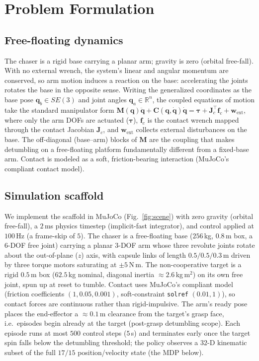 \documentclass[conference]{IEEEtran}
\begin{document}
\section{Problem Formulation}
\subsection{Free-floating dynamics}
The chaser is a rigid base carrying a planar arm; gravity is zero (orbital free-fall). With no
external wrench, the system's linear and angular momentum are conserved, so arm motion induces a
reaction on the base: accelerating the joints rotates the base in the opposite sense. Writing the
generalized coordinates as the base pose $\mathbf{q}_b\in SE(3)$ and joint angles
$\mathbf{q}_a\in\mathbb{R}^{n}$, the coupled equations of motion take the standard manipulator form
$\mathbf{M}(\mathbf{q})\ddot{\mathbf{q}} + \mathbf{C}(\mathbf{q},\dot{\mathbf{q}})\dot{\mathbf{q}}
= \boldsymbol{\tau} + \mathbf{J}_c^{\top}\mathbf{f}_c + \mathbf{w}_{\text{ext}}$, where only the arm
DOFs are actuated ($\boldsymbol{\tau}$), $\mathbf{f}_c$ is the contact wrench mapped through the
contact Jacobian $\mathbf{J}_c$, and $\mathbf{w}_{\text{ext}}$ collects external disturbances on the
base. The off-diagonal (base--arm) blocks of $\mathbf{M}$ are the coupling that makes detumbling on a
free-floating platform fundamentally different from a fixed-base arm. Contact is modeled as a soft,
friction-bearing interaction (MuJoCo's compliant contact model).

\subsection{Simulation scaffold}
We implement the scaffold in MuJoCo (Fig.~\ref{fig:scene}) with zero gravity (orbital free-fall),
a $2$\,ms physics timestep (implicit-fast integrator), and control applied at $100$\,Hz (a
frame-skip of $5$). The chaser is a free-floating base ($256$\,kg, $0.8$\,m box, a 6-DOF free
joint) carrying a planar $3$-DOF arm whose three revolute joints rotate about the out-of-plane
($z$) axis, with capsule links of length $0.5/0.5/0.3$\,m driven by three torque motors saturating
at $\pm 5$\,N\,m. The non-cooperative target is a rigid $0.5$\,m box ($62.5$\,kg nominal, diagonal
inertia $\approx 2.6$\,kg\,m$^2$) on its own free joint, spun up at reset to tumble. Contact uses
MuJoCo's compliant model (friction coefficients $(1, 0.05, 0.001)$, soft-constraint
\texttt{solref} $(0.01, 1)$), so contact forces are continuous rather than rigid-impulsive. The
arm's ready pose places the end-effector a $\approx 0.1$\,m clearance from the target's grasp face,
i.e.\ episodes begin already at the target (post-grasp detumbling scope). Each episode runs at most
$500$ control steps ($5$\,s) and terminates early once the target spin falls below the detumbling
threshold; the policy observes a $32$-D kinematic subset of the full $17/15$ position/velocity state
(the MDP below).
\end{document}
